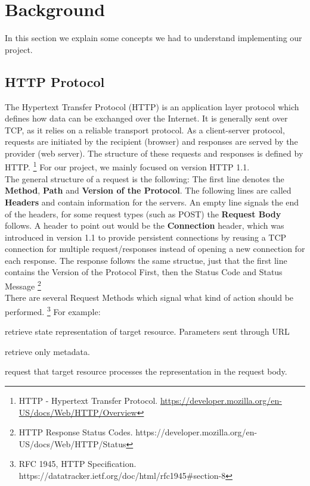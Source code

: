 \section*{Background}
In this section we explain some concepts we had to understand implementing our project. 

\subsection*{HTTP Protocol}
The Hypertext Transfer Protocol (HTTP) is an application layer protocol which defines how data can be exchanged over the Internet. It is generally sent over TCP, as it relies on a reliable transport protocol. 
As a client-server protocol, requests are initiated by the recipient (browser) and responses are served by the provider (web server). The structure of these requests and responses is defined by HTTP. \footnote{HTTP - Hypertext Transfer Protocol. \url{https://developer.mozilla.org/en-US/docs/Web/HTTP/Overview}} For our project, we mainly focused on version HTTP 1.1. \\

The general structure of a request is the following: The first line denotes the \textbf{Method}, \textbf{Path} and \textbf{Version of the Protocol}. The following lines are called \textbf{Headers} and contain information for the servers. An empty line signals the end of the headers, for some request types (such as POST) the \textbf{Request Body} follows. A header to point out would be the \textbf{Connection} header, which was introduced in version 1.1 to provide persistent connections by reusing a TCP connection for multiple request/responses instead of opening a new connection for each response. The response follows the same structue, just that the first line contains the Version of the Protocol First, then the Status Code and Status Message \footnote{HTTP Response Status Codes. https://developer.mozilla.org/en-US/docs/Web/HTTP/Status} \\

There are several Request Methods which signal what kind of action should be performed. \footnote{RFC 1945, HTTP Specification. https://datatracker.ietf.org/doc/html/rfc1945\#section-8} For example: 
\begin{description}[noitemsep, topsep=1pt,leftmargin=*]
    \item[GET]retrieve state representation of target resource. Parameters sent through URL 
    \item[HEAD]retrieve only metadata. 
    \item[POST]request that target resource processes the representation in the request body. 
\end{description}

